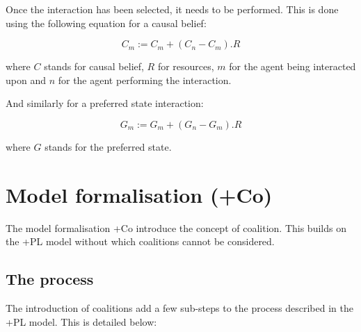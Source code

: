 \documentclass[11pt]{article}
\begin{document}
Once the interaction has been selected, it needs to be performed. This is done using the following equation for a causal belief:

\begin{equation}
C_{m} := C_{m} + (C_{n} - C_{m}). R
\end{equation}

where $C$ stands for causal belief, $R$ for resources, $m$ for the agent being interacted upon and $n$ for the agent performing the interaction.

And similarly for a preferred state interaction:

\begin{equation}
G_{m} := G_{m} + (G_{n} - G_{m}). R
\end{equation}

where $G$ stands for the preferred state.




\section{Model formalisation (+Co)}

The model formalisation +Co introduce the concept of coalition. This builds on the +PL model without which coalitions cannot be considered.

\subsection{The process}

The introduction of coalitions add a few sub-steps to the process described in the +PL model. This is detailed below:
\end{document}
